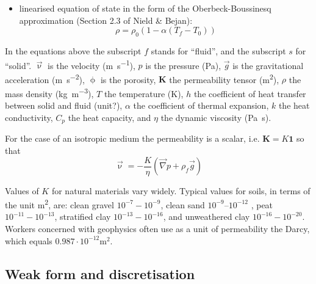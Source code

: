 \begin{itemize}
When it is assumed that there is local thermal equilibrium then $T_f=T_s=T$ (Section 2.1 of Nield \& Bejan). 
Then one can add the equations together and obtain 
\[
(\rho C_p)_m \frac{\partial T}{\partial t} 
+
(\rho C_p)_f \vec{\upnu} \cdot \vec\nabla T 
= 
\vec\nabla \cdot ( k_m \vec\nabla T)
+ q_m
\]
with 
\begin{eqnarray}
(\rho C_p)_m &=& (1-\upphi) (\rho C_p)_s + \upphi (\rho C_p)_ f\\ k_m &=& (1-\upphi) k_s + \upphi k_f \\
q_m &=& (1-\upphi) q_s + \upphi q_f 
\end{eqnarray}

\item linearised equation of state in the form of the Oberbeck-Boussinesq approximation (Section 2.3 of Nield \& Bejan):
\[
\rho=\rho_0(1-\alpha(T_f-T_0))
\]
\end{itemize}

\noindent In the equations above the subscript $f$ stands for ``fluid'', and the subscript $s$ for ``solid''. $\vec{\upnu}$ is the velocity (\si{\metre\per\second}), $p$ is the pressure (\si{\pascal}), $\vec{g}$ is the gravitational acceleration (\si{\metre\per\square\second}), $\upphi$ is the porosity, ${\bm K}$ the permeability tensor (\si{\square\metre}), $\rho$ the mass density (\si{\kg\per\cubic\metre}), $T$ the temperature (\si{\kelvin}), $h$ the coefficient of heat transfer between solid and fluid (unit?), $\alpha$ the coefficient of thermal expansion, $k$ the heat conductivity, $C_p$ the heat capacity, and $\eta$ the dynamic viscosity (\si{\pascal\second}). 

For the case of an isotropic medium the permeability is a scalar, i.e. ${\bm K}=K {\bm 1}$ so that 
\begin{equation}
\vec{\upnu} = -\frac{K}{\eta} (\vec\nabla p + \rho_f \vec{g})
\label{eq:darcy2}
\end{equation}

Values of $K$ for natural materials vary widely. Typical values for soils, in terms of the unit \si{\square\metre}, 
are: clean gravel $10^{-7}-10^{-9}$, 
clean sand $10^{-9}–10^{-12}$ , peat $10^{-11}-10^{-13}$,
stratified clay $10^{-13}-10^{-16}$, 
and unweathered clay $10^{-16}-10^{-20}$. 
Workers concerned with geophysics often use as a unit of permeability the Darcy, which equals $0.987\cdot 10^{-12}\si{\square\metre}$.



\subsection{Weak form and discretisation}

